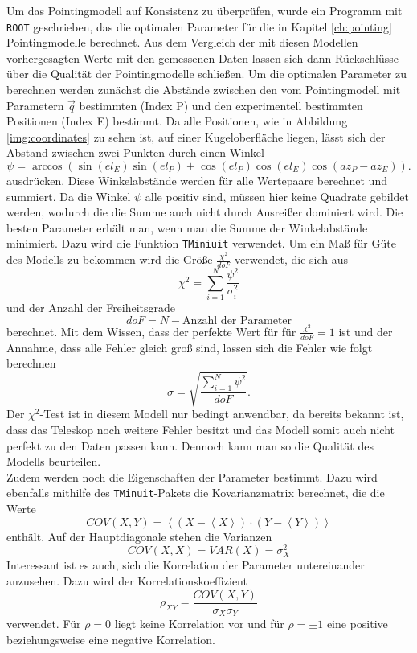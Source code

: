 Um das Pointingmodell auf Konsistenz zu überprüfen, wurde ein Programm mit \texttt{ROOT} geschrieben, das die optimalen Parameter für die in Kapitel \ref{ch:pointing} Pointingmodelle berechnet. Aus dem Vergleich der mit diesen Modellen vorhergesagten Werte mit den gemessenen Daten lassen sich dann Rückschlüsse über die Qualität der Pointingmodelle schließen. Um die optimalen Parameter zu berechnen werden zunächst die Abstände zwischen den vom Pointingmodell mit Parametern $\vec{q}$ bestimmten (Index P) und den experimentell bestimmten Positionen (Index E) bestimmt. Da alle Positionen, wie in Abbildung \ref{img:coordinates} zu sehen ist, auf einer Kugeloberfläche liegen, lässt sich der Abstand zwischen zwei Punkten durch einen Winkel 
\begin{equation}
\psi=\arccos\left(\sin(el_E)\sin(el_P)+\cos(el_P)\cos(el_E)\cos(az_P-az_E)\right).
\end{equation}
ausdrücken. Diese Winkelabstände werden für alle Wertepaare berechnet und summiert. Da die Winkel $\psi$ alle positiv sind, müssen hier keine Quadrate gebildet werden, wodurch die die Summe auch nicht durch Ausreißer dominiert wird. Die besten Parameter erhält man, wenn man die Summe der Winkelabstände minimiert. Dazu wird die Funktion \texttt{TMiniuit} verwendet. Um ein Maß für Güte des Modells zu bekommen wird die Größe $\frac{\chi^2}{doF}$ verwendet, die sich aus 
\begin{equation}
\chi^2=\sum^N_{i=1}\frac{\psi^2}{\sigma_i^2}
\end{equation}
und der Anzahl der Freiheitsgrade
\begin{equation}
doF=N-\textrm{Anzahl der Parameter}
\end{equation}
berechnet. Mit dem Wissen, dass der perfekte Wert für für $\frac{\chi^2}{doF}=1$ ist und der Annahme, dass alle Fehler gleich groß sind, lassen sich die Fehler wie folgt berechnen
\begin{equation}
\sigma=\sqrt{\frac{\sum^N_{i=1}\psi^2}{doF}}.
\end{equation}
Der $\chi^2$-Test ist in diesem Modell nur bedingt anwendbar, da bereits bekannt ist, dass das Teleskop noch weitere Fehler besitzt und das Modell somit auch nicht perfekt zu den Daten passen kann. Dennoch kann man so die Qualität des Modells beurteilen.\\
Zudem werden noch die Eigenschaften der Parameter bestimmt. Dazu wird ebenfalls mithilfe des \texttt{TMinuit}-Pakets die Kovarianzmatrix berechnet, die die Werte
\begin{equation}
COV(X,Y)=\left<\left(X-\left<X\right>\right)\cdot\left(Y-\left<Y\right>\right)\right>
\end{equation}
enthält. Auf der Hauptdiagonale stehen die Varianzen
\begin{equation}
COV(X,X)=VAR(X)=\sigma_X^2
\end{equation}
Interessant ist es auch, sich die Korrelation der Parameter untereinander anzusehen. Dazu wird der Korrelationskoeffizient 
\begin{equation}
\rho_{XY}=\frac{COV(X,Y)}{\sigma_X\sigma_Y}
\end{equation}
verwendet. Für $\rho=0$ liegt keine Korrelation vor und für $\rho=\pm1$ eine positive beziehungsweise eine negative Korrelation.

